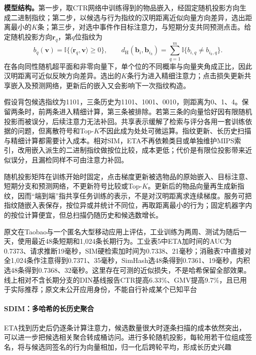 \textbf{模型结构。}第一步，取CTR网络中训练得到的物品嵌入，经固定随机投影方向生成二进制指纹；第二步，以候选与行为指纹的汉明距离近似向量方向差异，选出距离最小的$K$条；第三步，对选中事件作目标注意力，与短期分支共同预测点击。给定随机投影方向$\bm{r}_q$，第$q$位指纹为
\begin{equation}
  b_q(\bm{v})=\mathbb{I}\{\langle\bm{r}_q,\bm{v}\rangle\geq0\},
  \qquad
  d_{\mathrm{H}}(\bm{b}_i,\bm{b}_{i_k})
     =\sum_{q=1}^{m}\mathbb{I}\{b_{i,q}\ne b_{i_k,q}\}.
  \label{eq:rs-eta-hash}
\end{equation}
在各向同性随机超平面和非零向量下，单个位的不同概率与向量夹角成正比，因此汉明距离可近似反映方向差异。选出的$K$条行为进入精细注意力；点击损失更新共享嵌入及预测网络，更新后的嵌入又会影响下一次指纹构造。

假设背包候选指纹为1101，三条历史为1101、1001、0010，则距离为0、1、4。保留两条时，前两条进入精细计算，第三条被排除。若第三条的向量恰好因有限随机投影而被误分，后续注意力无法补回。共享表示缓解了检索与评分各用一套训练依据的问题，但离散符号和Top-$K$不因此成为处处可微运算。指纹更新、长历史扫描与精细计算都需要计入成本。相对SIM，ETA不再依赖类目或单独维护MIPS索引，改用嵌入派生的二进制指纹做按位比较，成本更低；代价是有限位投影带来近似误分，且漏检同样不可由注意力补回。

随机投影矩阵在训练开始时固定，点击梯度更新被选物品的原始嵌入、目标注意、短期分支和预测网络，不更新符号比较或Top-$K$。更新后的物品向量再生成新指纹，因而“端到端”指共享任务训练的表示，不是对汉明距离求连续梯度。服务可把指纹随嵌入表保存，按位异或并统计不同位，再取距离最小的行为；固定机器字内的按位计算便宜，但总扫描仍随历史和候选数增长。

原文在Taobao与一个匿名大型移动应用上评估，工业训练为两周、测试为随后一天，使用最近48条短期和1,024条长期行为。工业表5中ETA加时间的AUC为0.7373、请求推断19毫秒，SIM硬检索加时间为0.7338、21毫秒；消融表7中直接对全1,024条作注意得到0.7371、35毫秒，SimHash选48条得到0.7361、19毫秒，内积选48条得到0.7368、32毫秒。这里存在可测的近似损失，不是哈希保留全部效果。线上相对不含长期分支的DIN基线报告CTR提高6.33\%、GMV提高9.7\%，且已用于实际推荐；原文未公开应用身份，不能自行补成某个已知平台

\paragraph{SDIM：多哈希的长历史聚合}
\label{sec:rs-sdim}

ETA找到历史后仍逐条计算注意力，候选数量很大时逐条扫描的成本依然突出，可以进一步把候选相关聚合转成桶访问。进行多轮随机投影，每轮用若干位组成签名，将与候选同签名的行为向量相加，归一化后跨轮平均，形成长历史兴趣

